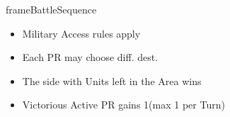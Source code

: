 \documentclass[10pt]{article}
\newlength{\fhBattleSequence} \setlength\fhBattleSequence{31\baselineskip}
\begin{document}
\begin{dynamiccontents*}{frameBattleSequence}
\begin{eubox}{\fhBattleSequence}
\begin{multicols}{3}
\begin{itemize}
\begin{itemize}
\begin{itemize}
					\item Military Access rules apply
					\item Each PR may choose diff. dest.
				\end{itemize}
			\end{itemize}
		\end{itemize}
		\begin{itemize}
			\item The side with Units left in the Area wins
			\item Victorious Active PR gains 1\milpower (max 1 per Turn)
		\end{itemize}
	\end{multicols}
\end{eubox}\end{dynamiccontents*}
\end{document}
